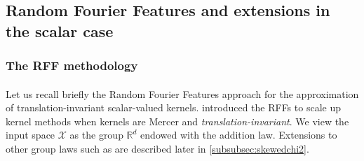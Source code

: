 \documentclass[twoside,11pt]{article}
\begin{document}
\subsection{Random Fourier Features and extensions in the scalar case}
\subsubsection{The RFF methodology}
\paragraph{}
Let us recall briefly the Random Fourier Features approach for the approximation of translation-invariant scalar-valued kernels.
\citet{Rahimi2007} introduced the \aclp{RFF} to
scale up kernel methods when kernels are Mercer and
\emph{translation-invariant}.  We view the input space $\mathcal{X}$ as the
group $\mathbb{R}^d$ endowed with the addition law. Extensions to other group
laws such as \citet{li2010random} are described later in \cref{subsubsec:skewedchi2}.
\end{document}
